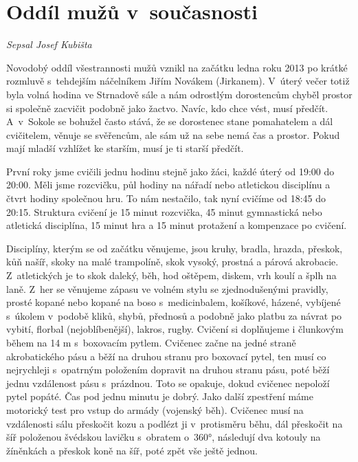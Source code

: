 \documentclass[a5paper, 11pt, twoside]{article}
\begin{document}
\section{Oddíl mužů v~současnosti}

\begin{center}
  \textit{Sepsal Josef Kubišta}
\end{center}

Novodobý oddíl všestrannosti mužů vznikl na začátku ledna roku 2013 po
krátké rozmluvě s~tehdejším náčelníkem Jiřím Novákem (Jirkanem). V~úterý
večer totiž byla volná hodina ve Strnadově sále a nám odrostlým
dorostencům chyběl prostor si společně zacvičit podobně jako žactvo.
Navíc, kdo chce vést, musí předčít. A~v~Sokole se bohužel často stává,
že se dorostenec stane pomahatelem a dál cvičitelem, věnuje se
svěřencům, ale sám už na sebe nemá čas a prostor. Pokud mají mladší
vzhlížet ke starším, musí je ti starší předčít.

První roky jsme cvičili jednu hodinu stejně jako žáci, každé úterý od
19:00 do 20:00. Měli jsme rozcvičku, půl hodiny na nářadí nebo
atletickou disciplínu a čtvrt hodiny společnou hru. To nám nestačilo,
tak nyní cvičíme od 18:45 do 20:15. Struktura cvičení je 15 minut
rozcvička, 45 minut gymnastická nebo atletická disciplína, 15 minut hra
a 15 minut protažení a kompenzace po cvičení.

Disciplíny, kterým se od začátku věnujeme, jsou kruhy, bradla, hrazda,
přeskok, kůň našíř, skoky na malé trampolíně, skok vysoký, prostná a
párová akrobacie. Z~atletických je to skok daleký, běh, hod oštěpem,
diskem, vrh koulí a šplh na laně. Z~her se věnujeme zápasu ve volném
stylu se zjednodušenými pravidly, prosté kopané nebo kopané na boso
s~medicinbalem, košíkové, házené, vybíjené s~úkolem v~podobě kliků, shybů,
přednosů a podobně jako platbu za návrat po vybití, florbal
(nejoblíbenější), lakros, rugby. Cvičení si doplňujeme i člunkovým během
na 14 m s~boxovacím pytlem. Cvičenec začne na jedné straně akrobatického
pásu a běží na druhou stranu pro boxovací pytel, ten musí co nejrychleji
s~opatrným položením dopravit na druhou stranu pásu, poté běží jednu
vzdálenost pásu s~prázdnou. Toto se opakuje, dokud cvičenec nepoloží
pytel popáté. Čas pod jednu minutu je dobrý. Jako další zpestření máme
motorický test pro vstup do armády (vojenský běh). Cvičenec musí na
vzdálenosti sálu přeskočit kozu a podlézt ji v~protisměru běhu, dál
přeskočit na šíř položenou švédskou lavičku s~obratem o~360°, následují
dva kotouly na žíněnkách a přeskok koně na šíř, poté zpět vše ještě
jednou.
\end{document}
